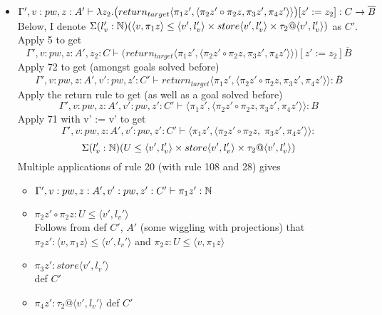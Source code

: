 \message{ !name(paper.tex)}\documentclass{article}
\begin{document}
\begin{itemize}
\begin{itemize}
\begin{itemize}
    \item $\Gamma', v: pw, z: A' \vdash \lambda z_2. \big(return_{target}\langle \pi_1 z', \langle \pi_2 z' \circ \pi_2 z, \pi_3 z', \pi_4 z' \rangle \rangle \big)[z' := z_2] : C \rightarrow \overline{B}$\\
    Below, I denote $\Sigma(l_v' : \mathbb{N})(\langle v, \pi_1 z\rangle \leq \langle v', l_v' \rangle \times store\langle v', l_v' \rangle \times \tau_2 @ \langle v', l_v' \rangle)$ as $C'$.\\
    Apply 5 to get 
    \[\Gamma', v: pw, z: A', z_2: C \vdash  \big(return_{target}\langle \pi_1 z', \langle \pi_2 z' \circ \pi_2 z, \pi_3 z', \pi_4 z' \rangle \rangle \big)[z' := z_2] \overline{B}\]
    Apply 72 to get (amongst goals solved before)
    \[\Gamma', v: pw, z: A', v': pw, z': C' \vdash  return_{target}\langle \pi_1 z', \langle \pi_2 z' \circ \pi_2 z, \pi_3 z', \pi_4 z' \rangle \rangle: \overline{B}\]
    Apply the return rule to get (as well as a goal solved before)
    \[\Gamma', v: pw, z: A', v': pw, z': C' \vdash 
    \langle \pi_1 z', \langle \pi_2 z' \circ \pi_2 z, \pi_3 z', \pi_4 z' \rangle \rangle : B
    \]
    Apply 71 with v' := v' to get 
     \[\Gamma', v: pw, z: A', v': pw, z': C' \vdash 
    \langle \pi_1 z', \langle \pi_2 z' \circ \pi_2 z,\; \pi_3 z', \pi_4 z' \rangle \rangle :\]
    \[\Sigma(l_v' : \mathbb{N})(U \leq \langle v', l_v' \rangle \times store\langle v', l_v' \rangle \times \tau_2 @ \langle v', l_v' \rangle)
    \]
    Multiple applications of rule 20 (with rule 108 and 28) gives
    \begin{itemize}
        \item $\Gamma', v: pw, z: A', v': pw, z': C' \vdash 
\pi_1 z' : \mathbb{N}$
\item $\pi_2 z' \circ \pi_2 z : U \leq \langle v', l_v' \rangle$\\
Follows from def $C'$, $A'$ (some wiggling with projections)
that $\pi_2 z' : \langle v, \pi_1 z \rangle \leq \langle v', l_v' \rangle$ and $\pi_2 z :U \leq \langle v, \pi_1 z \rangle$
\item $\pi_3 z' : store\langle v', l_v' \rangle $\\
def $C'$
\item $\pi_4 z' : \tau_2 @ \langle v', l_v' \rangle$
def $C'$
    \end{itemize}
\end{itemize}

\end{itemize}

\end{itemize}
\end{document}
